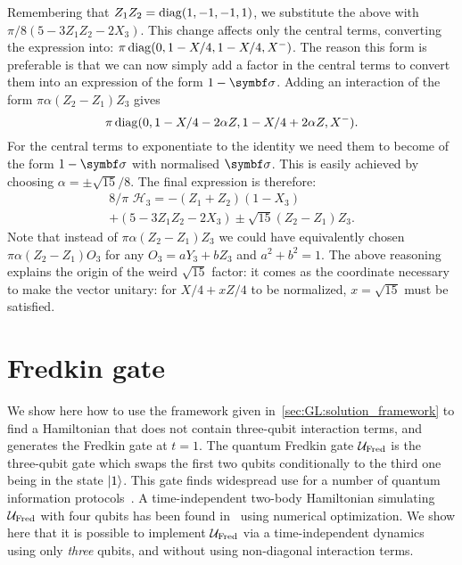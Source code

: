 Remembering that $Z_1 Z_2 = \operatorname{diag}(1, -1, -1, 1)$, we substitute the above with
$\pi/8(5 - 3Z_1 Z_2 - 2X_3)$.
This change affects only the central terms, converting the expression into:
$\pi \operatorname{diag}(0, 1 - X/4, 1 - X/4, X^-)$.
The reason this form is preferable is that we can now simply add a factor in the central terms to convert them into an expression of the form $1 - \bs\sigma$.
Adding an interaction of the form $\pi \alpha (Z_2 - Z_1)Z_3$ gives
\begin{equation}
	\pi\operatorname{diag}(0, 1 - X/4 - 2\alpha Z, 1 - X/4 + 2\alpha Z, X^-).
\end{equation}
For the central terms to exponentiate to the identity we need them to become of the form $1-\bs\sigma$ with normalised $\bs\sigma$.
This is easily achieved by choosing $\alpha=\pm\sqrt{15}/8$.
The final expression is therefore:
\begin{equation}
\begin{aligned}
	8/\pi \,\, \mathcal H_3 = -(Z_1 + Z_2)(1 - X_3) \\+ (5 - 3Z_1Z_2 - 2 X_3)
				 \pm \sqrt{15} (Z_2 - Z_1)Z_3.
\end{aligned}
\end{equation}
Note that instead of $\pi \alpha (Z_2 - Z_1)Z_3$ we could have equivalently chosen
$\pi\alpha(Z_2-Z_1)O_3$ for any $O_3 = a Y_3 + b Z_3$ and $a^2 + b^2 = 1$.
The above reasoning explains the origin of the weird $\sqrt{15}$ factor: it comes as the coordinate necessary to make the vector unitary: for $X/4 + x Z / 4$ to be normalized, $x = \sqrt{15}$ must be satisfied.

\section{Fredkin gate}
\label{sec:GL:fredkin}

We show here how to use the framework given in~\cref{sec:GL:solution_framework} to find a Hamiltonian that does not contain three-qubit interaction terms, and generates the Fredkin gate at $t=1$.
The quantum Fredkin gate ${\mathcal{U}}_{\operatorname{Fred}}$ is the three-qubit gate which swaps the first two qubits conditionally to the third one being in the state $\ket1$.
This gate finds widespread use for a number of quantum information protocols~\cite{patel2016quantum,loft2018quantum}.
A time-independent two-body Hamiltonian simulating ${\mathcal{U}}_{\operatorname{Fred}}$ with four qubits has been found in~\cite{banchi2016quantum} using numerical optimization.
We show here that it is possible to implement ${\mathcal{U}}_{\operatorname{Fred}}$ via a time-independent dynamics using only \textit{three} qubits, and without using non-diagonal interaction terms.

